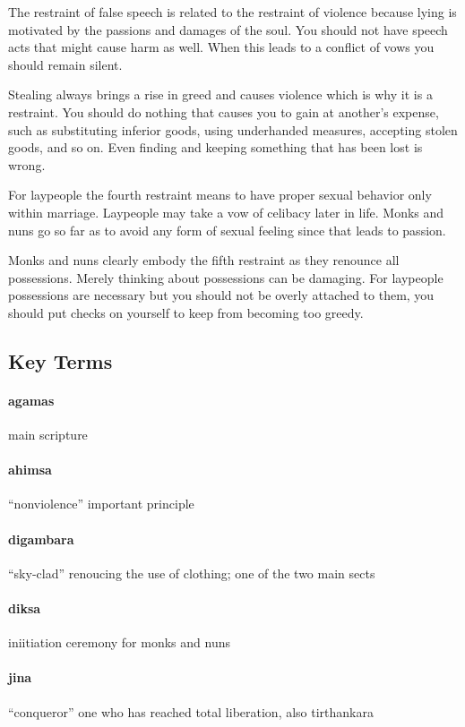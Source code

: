 \documentclass{article}
\begin{document}
The restraint of false speech is related to the restraint of violence because lying is motivated by the passions and damages of the soul. You should not have speech acts that might cause harm as well. When this leads to a conflict of vows you should remain silent.

Stealing always brings a rise in greed and causes violence which is why it is a restraint. You should do nothing that causes you to gain at another's expense, such as substituting inferior goods, using underhanded measures, accepting stolen goods, and so on. Even finding and keeping something that has been lost is wrong.

For laypeople the fourth restraint means to have proper sexual behavior only within marriage. Laypeople may take a vow of celibacy later in life. Monks and nuns go so far as to avoid any form of sexual feeling  since that leads to passion.

Monks and nuns clearly embody the fifth restraint as they renounce all possessions. Merely thinking about possessions can be damaging. For laypeople possessions are necessary but you should not be overly attached to them, you should put checks on yourself to keep from becoming too greedy.

\subsection*{Key Terms}
\label{sub:key_terms}
\paragraph{agamas}
\label{par:agamas}
main scripture
\paragraph{ahimsa}
\label{par:ahimsa}
``nonviolence'' important principle
\paragraph{digambara}
\label{par:digambara}
``sky-clad'' renoucing the use of clothing; one of the two main sects
\paragraph{diksa}
\label{par:diksa}
iniitiation ceremony for monks and nuns
\paragraph{jina}
\label{par:jina}
``conqueror'' one who has reached total liberation, also tirthankara
\end{document}
